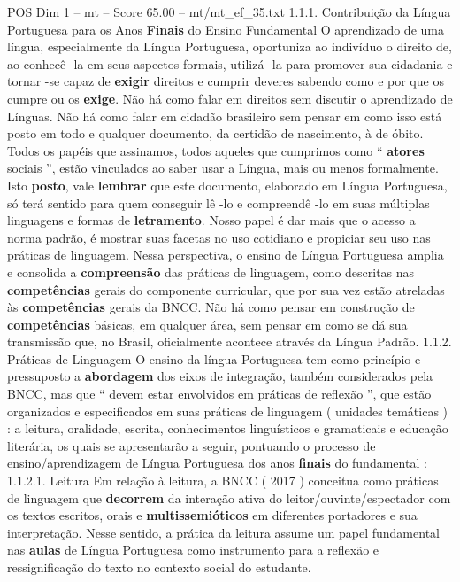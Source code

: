 \begin{textsample}{POS Dim 1 – mt – Score 65.00 – mt/mt\_ef\_35.txt}  \label{ex:f1_pos_077}
1.1.1.
Contribuição da Língua Portuguesa para os Anos \textbf{Finais} do Ensino Fundamental O aprendizado de uma língua, especialmente da Língua Portuguesa, oportuniza ao indivíduo o direito de, ao conhecê -la em seus aspectos formais, utilizá -la para promover sua cidadania e tornar -se capaz de \textbf{exigir} direitos e cumprir deveres sabendo como e por que os cumpre ou os \textbf{exige}.
Não há como falar em direitos sem discutir o aprendizado de Línguas.
Não há como falar em cidadão brasileiro sem pensar em como isso está posto em todo e qualquer documento, da certidão de nascimento, à de óbito.
Todos os papéis que assinamos, todos aqueles que cumprimos como “ \textbf{atores} sociais ”, estão vinculados ao saber usar a Língua, mais ou menos formalmente.
Isto \textbf{posto}, vale \textbf{lembrar} que este documento, elaborado em Língua Portuguesa, só terá sentido para quem conseguir lê -lo e compreendê -lo em suas múltiplas linguagens e formas de \textbf{letramento}.
Nosso papel é dar mais que o acesso a norma padrão, é mostrar suas facetas no uso cotidiano e propiciar seu uso nas práticas de linguagem.
Nessa perspectiva, o ensino de Língua Portuguesa amplia e consolida a \textbf{compreensão} das práticas de linguagem, como descritas nas \textbf{competências} gerais do componente curricular, que por sua vez estão atreladas às \textbf{competências} gerais da BNCC.
Não há como pensar em construção de \textbf{competências} básicas, em qualquer área, sem pensar em como se dá sua transmissão que, no Brasil, oficialmente acontece através da Língua Padrão. 1.1.2.
Práticas de Linguagem O ensino da língua Portuguesa tem como princípio e pressuposto a \textbf{abordagem} dos eixos de integração, também considerados pela BNCC, mas que “ devem estar envolvidos em práticas de reflexão ”, que estão organizados e especificados em suas práticas de linguagem ( unidades temáticas ) : a leitura, oralidade, escrita, conhecimentos linguísticos e gramaticais e educação literária, os quais se apresentarão a seguir, pontuando o processo de ensino/aprendizagem de Língua Portuguesa dos anos \textbf{finais} do fundamental : 1.1.2.1.
Leitura Em relação à leitura, a BNCC ( 2017 ) conceitua como práticas de linguagem que \textbf{decorrem} da interação ativa do leitor/ouvinte/espectador com os textos escritos, orais e \textbf{multissemióticos} em diferentes portadores e sua interpretação.
Nesse sentido, a prática da leitura assume um papel fundamental nas \textbf{aulas} de Língua Portuguesa como instrumento para a reflexão e ressignificação do texto no contexto social do estudante.

\end{textsample}
